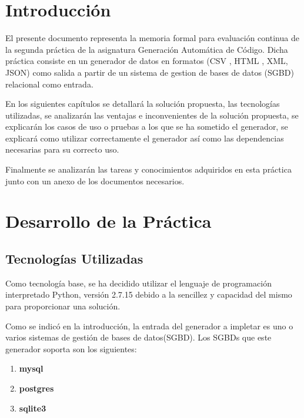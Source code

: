 \documentclass[a4paper,11pt]{book}
\begin{document}


\tableofcontents
\listoffigures

%

%


\chapter{Introducción}

El presente documento representa la memoria formal para evaluación continua de la segunda práctica de la asignatura  Generación Automática de Código. Dicha práctica consiste en un generador de datos en formatos (CSV , HTML , XML, JSON) como salida a partir de un sistema de gestion de bases de datos (SGBD) relacional como entrada.  

En los siguientes capítulos se detallará la solución propuesta, las tecnologías utilizadas, se analizarán las ventajas e inconvenientes de la solución propuesta, se explicarán los casos de uso o pruebas a los que se ha sometido el generador, se explicará como utilizar correctamente el generador así como las dependencias necesarias para su correcto uso. 

Finalmente se analizarán las tareas y conocimientos adquiridos en esta práctica junto con un anexo de los documentos necesarios.   



\chapter{Desarrollo de la Práctica}

\section{Tecnologías Utilizadas}

Como tecnología base, se ha decidido utilizar el lenguaje de programación interpretado Python\cite{py}, versión 2.7.15 debido a la sencillez y capacidad del mismo para proporcionar una solución. 

Como se indicó en la introducción, la entrada del generador a impletar es uno o varios sistemas de gestión de bases de datos(SGBD). Los SGBDs que este generador soporta son los siguientes:

\begin{enumerate}
\item \textbf{mysql}
\item \textbf{postgres}
\item \textbf{sqlite3}
\end{enumerate}
 
\end{document}
